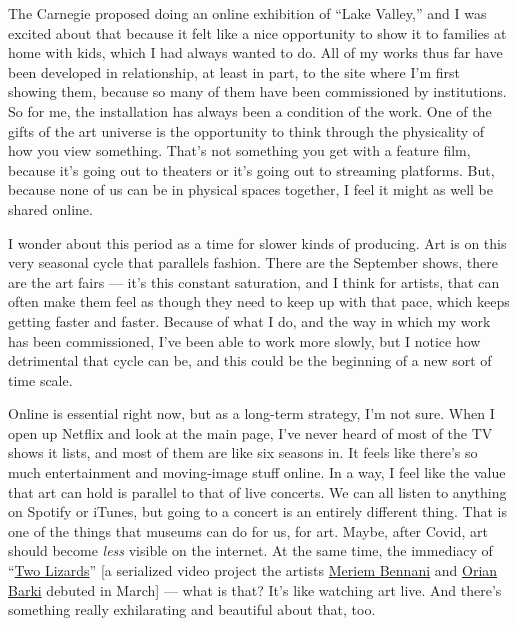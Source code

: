 The Carnegie proposed doing an online exhibition of ``Lake Valley,'' and
I was excited about that because it felt like a nice opportunity to show
it to families at home with kids, which I had always wanted to do. All
of my works thus far have been developed in relationship, at least in
part, to the site where I'm first showing them, because so many of them
have been commissioned by institutions. So for me, the installation has
always been a condition of the work. One of the gifts of the art
universe is the opportunity to think through the physicality of how you
view something. That's not something you get with a feature film,
because it's going out to theaters or it's going out to streaming
platforms. But, because none of us can be in physical spaces together, I
feel it might as well be shared online.

I wonder about this period as a time for slower kinds of producing. Art
is on this very seasonal cycle that parallels fashion. There are the
September shows, there are the art fairs --- it's this constant
saturation, and I think for artists, that can often make them feel as
though they need to keep up with that pace, which keeps getting faster
and faster. Because of what I do, and the way in which my work has been
commissioned, I've been able to work more slowly, but I notice how
detrimental that cycle can be, and this could be the beginning of a new
sort of time scale.

Online is essential right now, but as a long-term strategy, I'm not
sure. When I open up Netflix and look at the main page, I've never heard
of most of the TV shows it lists, and most of them are like six seasons
in. It feels like there's so much entertainment and moving-image stuff
online. In a way, I feel like the value that art can hold is parallel to
that of live concerts. We can all listen to anything on Spotify or
iTunes, but going to a concert is an entirely different thing. That is
one of the things that museums can do for us, for art. Maybe, after
Covid, art should become \emph{less} visible on the internet. At the
same time, the immediacy of
``\href{https://www.nytimes3xbfgragh.onion/2020/04/22/arts/design/lizards-instagram-coronavirus-stars.html}{Two
Lizards}'' {[}a serialized video project the artists
\href{https://www.nytimes3xbfgragh.onion/2015/10/28/t-magazine/art-meriem-bennani-hijab-video.html}{Meriem
Bennani} and \href{https://www.orianbarki.com/}{Orian Barki} debuted in
March{]} --- what is that? It's like watching art live. And there's
something really exhilarating and beautiful about that, too.

